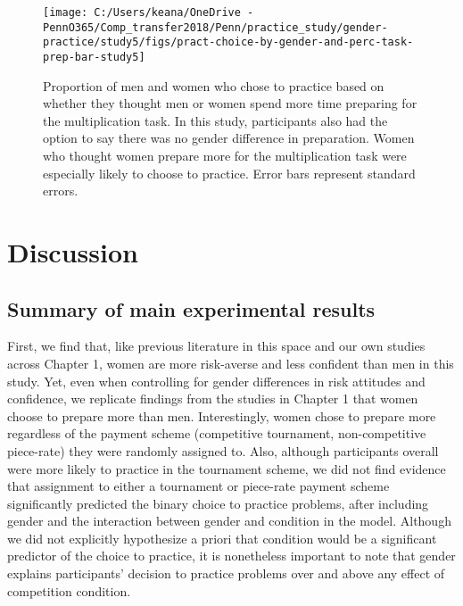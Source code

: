 \documentclass[letterpaper, nobind]{templates/ociamthesis}
\begin{document}
\begin{figure}

{\centering \texttt{[image: C:/Users/keana/OneDrive - PennO365/Comp\_transfer2018/Penn/practice\_study/gender-practice/study5/figs/pract-choice-by-gender-and-perc-task-prep-bar-study5]} 

}

\caption{Proportion of men and women who chose to practice based on whether they thought men or women spend more time preparing for the multiplication task. In this study, participants also had the option to say there was no gender difference in preparation. Women who thought women prepare more for the multiplication task were especially likely to choose to practice. Error bars represent standard errors.}\label{fig:pract-choice-by-gender-and-perc-task-prep-bar-study5}
\end{figure}

\hypertarget{discussion-3}{%
\section{Discussion}\label{discussion-3}}

\hypertarget{summary-of-main-experimental-results-3}{%
\subsection{Summary of main experimental results}\label{summary-of-main-experimental-results-3}}

First, we find that, like previous literature in this space and our own studies across Chapter 1, women are more risk-averse and less confident than men in this study. Yet, even when controlling for gender differences in risk attitudes and confidence, we replicate findings from the studies in Chapter 1 that women choose to prepare more than men. Interestingly, women chose to prepare more regardless of the payment scheme (competitive tournament, non-competitive piece-rate) they were randomly assigned to. Also, although participants overall were more likely to practice in the tournament scheme, we did not find evidence that assignment to either a tournament or piece-rate payment scheme significantly predicted the binary choice to practice problems, after including gender and the interaction between gender and condition in the model. Although we did not explicitly hypothesize a priori that condition would be a significant predictor of the choice to practice, it is nonetheless important to note that gender explains participants' decision to practice problems over and above any effect of competition condition.
\end{document}
